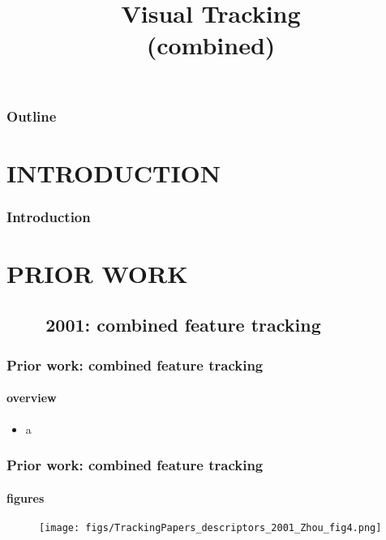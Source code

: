 
\title{Visual Tracking \\ (combined)}
\begin{frame}[plain]\logoTechTower
	\titlepage
\end{frame}

\begin{frame}
\frametitle{Outline}
\logoCSIPCPL\logoTechTower
	\setcounter{tocdepth}{1}	
	\tableofcontents
\end{frame}

\section{INTRODUCTION}
\begin{frame}
\frametitle{Introduction}
\framesubtitle{}
\logoCSIPCPL\mypagenum
\end{frame}

\section{PRIOR WORK}
\subsection{\ \ \ \ 2001: combined feature tracking}
\begin{frame}
\frametitle{Prior work: combined feature tracking}
\framesubtitle{overview}
\mypagenum
	\begin{itemize}
		\item a
	\end{itemize}
\end{frame}


\begin{frame}
\frametitle{Prior work: combined feature tracking}
\framesubtitle{figures}
\mypagenum
	\begin{figure}
		\texttt{[image: figs/TrackingPapers\_descriptors\_2001\_Zhou\_fig4.png]}
	\end{figure}
\end{frame}



\printbibliography

